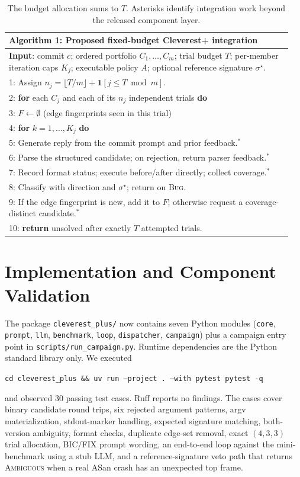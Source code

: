 \documentclass{article}
\begin{document}
\begin{table}[H]
\centering
\small
\begin{tabular}{|p{0.95\linewidth}|}
\hline
\textbf{Algorithm 1: Proposed fixed-budget Cleverest+ integration}\\
\hline
\textbf{Input}: commit $c$; ordered portfolio $C_1,\ldots,C_m$; trial budget
$T$; per-member iteration caps $K_j$; executable policy $A$; optional reference
signature $\sigma^\star$.\\
\hline
1: Assign $n_j=\lfloor T/m\rfloor+\mathbf{1}[j\leq T\bmod m]$.\\
2: \textbf{for} each $C_j$ and each of its $n_j$ independent trials \textbf{do}\\
3: \quad $F\leftarrow\emptyset$ \hfill (edge fingerprints seen in this trial)\\
4: \quad \textbf{for} $k=1,\ldots,K_j$ \textbf{do}\\
5: \qquad Generate reply from the commit prompt and prior feedback.$^\ast$\\
6: \qquad Parse the structured candidate; on rejection, return parser feedback.$^\ast$\\
7: \qquad Record format status; execute before/after directly; collect coverage.$^\ast$\\
8: \qquad Classify with direction and $\sigma^\star$; return on \textsc{Bug}.\\
9: \qquad If the edge fingerprint is new, add it to $F$; otherwise request a
coverage-distinct candidate.$^\ast$\\
10: \textbf{return} unsolved after exactly $T$ attempted trials.\\
\hline
\end{tabular}
\caption{The budget allocation sums to $T$.  Asterisks identify integration
work beyond the released component layer.}
\label{alg:plus}
\end{table}

\section{Implementation and Component Validation}
\label{sec:implementation}

The package \texttt{cleverest\_plus/} now contains seven Python modules
(\texttt{core}, \texttt{prompt}, \texttt{llm}, \texttt{benchmark},
\texttt{loop}, \texttt{dispatcher}, \texttt{campaign}) plus a campaign entry
point in \texttt{scripts/run\_campaign.py}. Runtime dependencies are the
Python standard library only. We executed
\begin{center}
\texttt{cd cleverest\_plus \&\& uv run --project . --with pytest pytest -q}
\end{center}
and observed 30 passing test cases.  Ruff reports no findings.  The cases
cover binary candidate round trips, six rejected argument patterns, argv
materialization, stdout-marker handling, expected signature matching,
both-version ambiguity, format checks, duplicate edge-set removal, exact
$(4,3,3)$ trial allocation, BIC/FIX prompt wording, an end-to-end loop
against the mini-benchmark using a stub LLM, and a reference-signature veto
path that returns \textsc{Ambiguous} when a real ASan crash has an
unexpected top frame.
\end{document}
